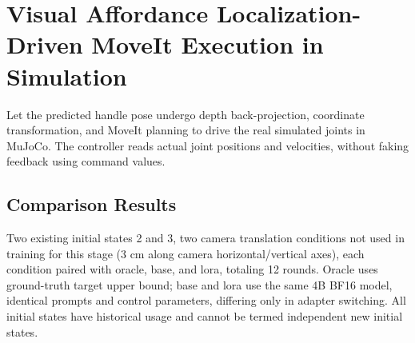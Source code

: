 \FloatBarrier

\section{Visual Affordance Localization-Driven MoveIt Execution in Simulation}

\label{stage:s19}

Let the predicted handle pose undergo depth back-projection, coordinate transformation, and MoveIt planning to drive the real simulated joints in MuJoCo. The controller reads actual joint positions and velocities, without faking feedback using command values.

\subsection{Comparison Results}\label{s19-detail-1}

Two existing initial states 2 and 3, two camera translation conditions not used in training for this stage (3 cm along camera horizontal/vertical axes), each condition paired with oracle, base, and lora, totaling 12 rounds. Oracle uses ground-truth target upper bound; base and lora use the same 4B BF16 model, identical prompts and control parameters, differing only in adapter switching. All initial states have historical usage and cannot be termed independent new initial states.

